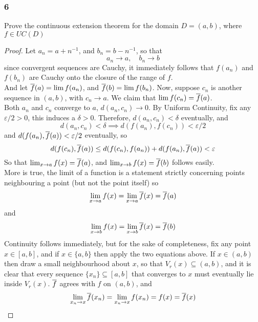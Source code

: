 \documentclass[../main.tex]{subfiles}
\begin{document}
\subsubsection*{6}
\providecommand{\uc}{\operatorname{UC}}
\providecommand{\ubc}{\operatorname{UBC}}
\begin{wts}
    Prove the continuous extension theorem for the domain $D=(a,b)$, where $f\in UC(D)$
\end{wts}
\begin{proof}
    Let $a_n = a + n^{-1}$, and $b_n = b - n^{-1}$, so that
    \[a_n \to a,\quad b_n \to b\]
    since convergent sequences are Cauchy, it immediately follows that $f(a_n)$ and $f(b_n)$ are Cauchy onto the closure of the range of $f$.\\
    
    And let $\overline{f}(a) = \lim f(a_n)$, and $\overline{f}(b)=\lim f(b_n)$. Now, suppose $c_n$ is another sequence in $(a,b)$, with $c_n\to a$. We claim that $\lim f(c_n)=\overline{f}(a)$.\\
    
    Both $a_n$ and $c_n$ converge to $a$, $d(a_n,c_n)\to 0$. By Uniform Continuity, fix any $\varepsilon/2>0$, this induces a $\delta>0$. Therefore, $d(a_n,c_n)<\delta$ eventually, and\[d(a_n,c_n)<\delta\implies d(f(a_n),f(c_n))<\varepsilon/2\]
    and $d(f(a_n),\overline{f}(a))<\varepsilon/2$ eventually, so
    \[d(f(c_n),\overline{f}(a))\leq d(f(c_n),f(a_n))+d(f(a_n),\overline{f}(a))<\varepsilon\]
    So that $\lim_{x\to a}f(x)=\overline{f}(a)$, and  $\lim_{x\to b}f(x)=\overline{f}(b)$ follows easily.\\
    
    More is true, the limit of a function is a statement strictly concerning points neighbouring a point (but not the point itself) so 
    \[\lim_{x\to a}f(x)=\lim_{x\to a}\overline{f}(x)=\overline{f}(a)\]
    and 
    \[\lim_{x\to b}f(x)=\lim_{x\to b}\overline{f}(x)=\overline{f}(b)\]
    Continuity follows immediately, but for the sake of completeness, fix any point $x\in [a,b]$, and if $x\in\{a,b\}$ then apply the two equations above. If $x\in (a,b)$ then draw a small neighbourhood about $x$, so that $V_r(x)\subseteq (a,b)$, and it is clear that every sequence $\{x_n\}\subseteq [a,b]$ that converges to $x$ must eventually lie inside $V_r(x)$. $\overline{f}$ agrees with $f$ on $(a,b)$, and \[\lim_{x_n\to x}\overline{f}(x_n)=\lim_{x_n\to x}f(x_n)=f(x)=\overline{f}(x)\]
\end{proof}
\end{document}
